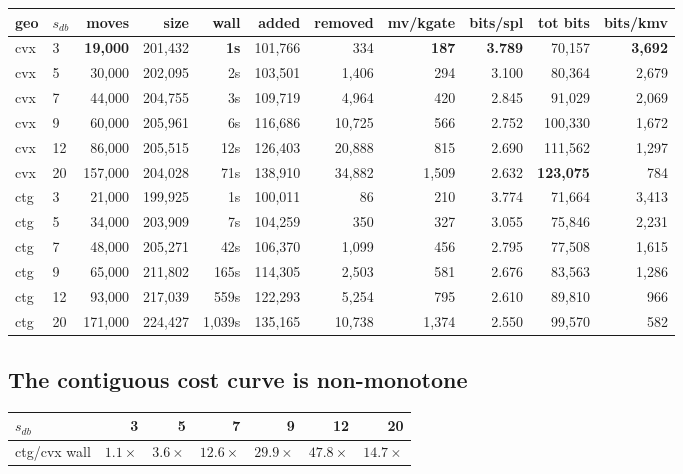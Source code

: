 \documentclass[11pt]{article}
\begin{document}
\begin{table}[h]\centering\footnotesize
\begin{tabular}{llrrrrrrrrr}
\toprule
geo & $s_{db}$ & moves & size & wall & added & removed & mv/kgate & bits/spl & tot bits & bits/kmv \\
\midrule
cvx & 3 & \textbf{19{,}000} & 201{,}432 & \textbf{1s} & 101{,}766 & 334 & \textbf{187} & \textbf{3.789} & 70{,}157 & \textbf{3{,}692} \\
cvx & 5 & 30{,}000 & 202{,}095 & 2s & 103{,}501 & 1{,}406 & 294 & 3.100 & 80{,}364 & 2{,}679 \\
cvx & 7 & 44{,}000 & 204{,}755 & 3s & 109{,}719 & 4{,}964 & 420 & 2.845 & 91{,}029 & 2{,}069 \\
cvx & 9 & 60{,}000 & 205{,}961 & 6s & 116{,}686 & 10{,}725 & 566 & 2.752 & 100{,}330 & 1{,}672 \\
cvx & 12 & 86{,}000 & 205{,}515 & 12s & 126{,}403 & 20{,}888 & 815 & 2.690 & 111{,}562 & 1{,}297 \\
cvx & 20 & 157{,}000 & 204{,}028 & 71s & 138{,}910 & 34{,}882 & 1{,}509 & 2.632 & \textbf{123{,}075} & 784 \\
\midrule
ctg & 3 & 21{,}000 & 199{,}925 & 1s & 100{,}011 & 86 & 210 & 3.774 & 71{,}664 & 3{,}413 \\
ctg & 5 & 34{,}000 & 203{,}909 & 7s & 104{,}259 & 350 & 327 & 3.055 & 75{,}846 & 2{,}231 \\
ctg & 7 & 48{,}000 & 205{,}271 & 42s & 106{,}370 & 1{,}099 & 456 & 2.795 & 77{,}508 & 1{,}615 \\
ctg & 9 & 65{,}000 & 211{,}802 & 165s & 114{,}305 & 2{,}503 & 581 & 2.676 & 83{,}563 & 1{,}286 \\
ctg & 12 & 93{,}000 & 217{,}039 & 559s & 122{,}293 & 5{,}254 & 795 & 2.610 & 89{,}810 & 966 \\
ctg & 20 & 171{,}000 & 224{,}427 & 1{,}039s & 135{,}165 & 10{,}738 & 1{,}374 & 2.550 & 99{,}570 & 582 \\
\bottomrule
\end{tabular}
\end{table}

\subsection{The contiguous cost curve is non-monotone}

\begin{center}\small
\begin{tabular}{lrrrrrr}
\toprule
$s_{db}$ & 3 & 5 & 7 & 9 & 12 & 20 \\
\midrule
ctg/cvx wall & $1.1\times$ & $3.6\times$ & $12.6\times$ & $29.9\times$ & $\mathbf{47.8\times}$ & $14.7\times$ \\
\bottomrule
\end{tabular}
\end{center}
\end{document}
